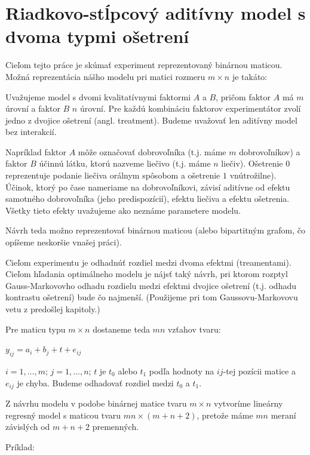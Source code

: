 \section{Riadkovo-stĺpcový aditívny model s dvoma typmi ošetrení}
\label{my model}

Cieľom tejto práce je skúmať experiment reprezentovaný binárnou maticou.
Možná reprezentácia nášho modelu pri matici rozmeru $m \times n$ je takáto:

Uvažujeme model s dvomi kvalitatívnymi faktormi $A$ a $B$, 
pričom faktor $A$ má $m$ úrovní a faktor $B$ $n$ úrovní. 
Pre každú kombináciu faktorov experimentátor zvolí jedno z dvojice ošetrení (angl. treatment).
Budeme uvažovať len aditívny model bez interakcií.

Napríklad faktor $A$ môže označovať dobrovoľníka (t.j. máme $m$ dobrovoľníkov) 
a faktor $B$ účinnú látku, ktorú nazveme liečivo (t.j. máme $n$ liečiv). 
Ošetrenie $0$ reprezentuje podanie liečiva orálnym spôsobom a ošetrenie $1$ vnútrožilne).
Účinok, ktorý po čase nameriame na dobrovoľníkovi, 
závisí aditívne od efektu samotného dobrovoľníka (jeho predispozícií), 
efektu liečiva a efektu ošetrenia. 
Všetky tieto efekty uvažujeme ako neznáme parametere modelu.

Návrh teda možno reprezentovať binárnou maticou 
(alebo bipartitným grafom, čo opíšeme neskoršie vnašej práci).

Cieľom experimentu je odhadnúť rozdiel medzi dvoma efektmi (treamentami).
Cieľom hľadania optimálneho modelu je nájsť taký návrh, pri ktorom
rozptyl Gauss-Markovovho odhadu rozdielu medzi efektmi dvojice ošetrení (t.j. odhadu kontrastu ošetrení) bude čo najmenší.
(Použijeme pri tom Gaussovu-Markovovu vetu z predošlej kapitoly.)

Pre maticu typu $m \times n$ dostaneme teda $mn$ vzťahov tvaru:

\begin{center}
$
y_{ij} = a_i + b_j + t + e_{ij}
$
\end{center}

$i = 1, \ldots, m$; $j = 1, \ldots, n$; $t$ je $t_0$ alebo $t_1$ podľa hodnoty na $ij$-tej pozícii matice a $e_{ij}$ je chyba.
Budeme odhadovať rozdiel medzi $t_0$ a $t_1$.

Z návrhu modelu v podobe binárnej matice tvaru $m \times n$ vytvoríme lineárny regresný model
s maticou tvaru $mn \times (m + n + 2)$, pretože máme $mn$ meraní závislých od $m + n + 2$ premenných.

Príklad:

